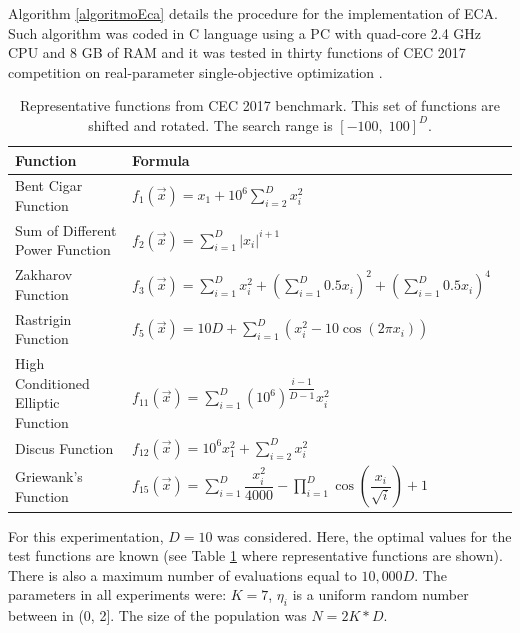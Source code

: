 \documentclass{svproc}
\begin{document}
Algorithm \ref{algoritmoEca} details the procedure for the implementation 
of ECA. Such algorithm was coded in C language using a PC  with 
quad-core 2.4 GHz CPU and 8 GB of RAM and it was tested in thirty 
functions of CEC 2017 competition on real-parameter single-objective optimization \cite{cec2017}.\\
%
%
\begin{table}[!ht]
	\caption{Representative functions from CEC 2017 benchmark. This set of %
	functions are shifted  and rotated. The search range is $[-100,\; 100]^D$.}
	\label{tab:funcs}
	\begin{tabular}{llc}
		\hline
		Function & Formula    \\ \hline
		Bent Cigar Function & $ \displaystyle f_1(\vec{x}) = x_1 + 10^6 \sum_{i=2}^D x_i^2 $  \\ \hline
		Sum of Different Power Function & $ \displaystyle f_2(\vec{x}) = \sum_{i=1}^D |x_i|^{i+1} $  \\ \hline
		Zakharov Function & $ \displaystyle f_3(\vec{x}) =  \sum_{i=1}^D x_i^2 + \left(\sum_{i=1}^D 0.5x_i\right)^2 + \left(\sum_{i=1}^D 0.5x_i\right)^4 $  \\ \hline
		Rastrigin Function & $ \displaystyle f_5(\vec{x}) =  10D + \sum_{i=1}^D (x_i^2 - 10\cos(2\pi x_i)) $  \\ \hline
		High Conditioned Elliptic Function & $ \displaystyle f_{11}(\vec{x}) =  \sum_{i=1}^D (10^6)^{\dfrac{i-1}{D-1}} x_i^2 $  \\ \hline
		Discus Function & $ \displaystyle f_{12}(\vec{x}) = 10^6 x_1^2 +\sum_{i=2}^D x_i^2 $  \\ \hline
		Griewank’s Function & $ \displaystyle f_{15}(\vec{x}) =  \sum_{i=1}^D \dfrac{x_i^2}{4000} - \prod_{i=1}^D \cos\left( \dfrac{x_i}{\sqrt{i}} \right) + 1 $  \\ \hline
	\end{tabular}
\end{table}


For this experimentation, $D = 10$ was considered. Here, the optimal values for the test 
functions are known (see Table \ref{tab:funcs} where representative functions are shown). There is also a maximum number of 
evaluations equal to $10,000D$. The parameters in all experiments were: $K = 7$, $\eta_i$ is a uniform random number 
between in (0, 2]. The size of the population was $N = 2K * D $.
\end{document}
